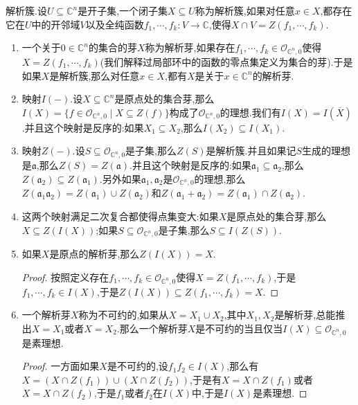 解析簇.设$U\subseteq\mathbb{C}^n$是开子集,一个闭子集$X\subseteq U$称为解析簇,如果对任意$x\in X$,都存在它在$U$中的开邻域$V$以及全纯函数$f_1,\cdots,f_k:V\to\mathbb{C}$,使得$X\cap V=Z(f_1,\cdots,f_k)$.
\begin{enumerate}
	\item 一个关于$0\in\mathbb{C}^n$的集合的芽$X$称为解析芽,如果存在$f_1,\cdots,f_k\in\mathscr{O}_{\mathbb{C}^n,0}$使得$X=Z(f_1,\cdots,f_k)$(我们解释过局部环中的函数的零点集定义为集合的芽).于是如果$X$是解析簇,那么对任意$x\in X$,都有$X$是关于$x\in\mathbb{C}^n$的解析芽.
	\item 映射$I(-)$.设$X\subseteq\mathbb{C}^n$是原点处的集合芽,那么$I(X)=\{f\in\mathscr{O}_{\mathbb{C}^n,0}\mid X\subseteq Z(f)\}$构成了$\mathscr{O}_{\mathbb{C}^n,0}$的理想.我们有$I(X)=I(\overline{X})$.并且这个映射是反序的:如果$X_1\subseteq X_2$,那么$I(X_2)\subseteq I(X_1)$.
	\item 映射$Z(-)$.设$S\subseteq\mathscr{O}_{\mathbb{C}^n,0}$是子集,那么$Z(S)$是解析簇.并且如果记$S$生成的理想是$\mathfrak{a}$,那么$Z(S)=Z(\mathfrak{a})$.并且这个映射是反序的:如果$\mathfrak{a}_1\subseteq\mathfrak{a}_2$,那么$Z(\mathfrak{a}_2)\subseteq Z(\mathfrak{a}_1)$.另外如果$\mathfrak{a}_1,\mathfrak{a}_2$是$\mathscr{O}_{\mathbb{C}^n,0}$的理想,那么$Z(\mathfrak{a}_1\mathfrak{a}_2)=Z(\mathfrak{a}_1)\cup Z(\mathfrak{a}_2)$和$Z(\mathfrak{a}_1+\mathfrak{a}_2)=Z(\mathfrak{a}_1)\cap Z(\mathfrak{a}_2)$.
	\item 这两个映射满足二次复合都使得点集变大:如果$X$是原点处的集合芽,那么$X\subseteq Z(I(X))$;如果$S\subseteq\mathscr{O}_{\mathbb{C}^n,0}$是子集,那么$S\subseteq I(Z(S))$.
	\item 如果$X$是原点的解析芽,那么$Z(I(X))=X$.
	\begin{proof}
		
		按照定义存在$f_1,\cdots,f_k\in\mathscr{O}_{\mathbb{C}^n,0}$使得$X=Z(f_1,\cdots,f_k)$,于是$f_1,\cdots,f_k\in I(X)$,于是$Z(I(X))\subseteq Z(f_1,\cdots,f_k)=X$.
	\end{proof}
    \item 一个解析芽$X$称为不可约的,如果从$X=X_1\cup X_2$,其中$X_1,X_2$是解析芽,总能推出$X=X_1$或者$X=X_2$.那么一个解析芽$X$是不可约的当且仅当$I(X)\subseteq\mathscr{O}_{\mathbb{C}^n,0}$是素理想.
    \begin{proof}
    	
    	一方面如果$X$是不可约的,设$f_1f_2\in I(X)$,那么有$X=(X\cap Z(f_1))\cup(X\cap Z(f_2))$,于是有$X=X\cap Z(f_1)$或者$X=X\cap Z(f_2)$,于是$f_1$或者$f_2$在$I(X)$中,于是$I(X)$是素理想.
    	
    	\qquad
    	

\end{proof}
\end{enumerate}
